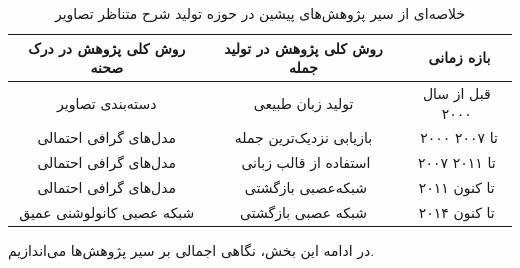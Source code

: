 \begin{table}[h]
	\centering
	\caption{خلاصه‌‌ای از سیر پژوهش‌های پیشین در حوزه تولید شرح متناظر تصاویر}
	\label{tbl:smry}
	\begin{tabular}{|c|c|c|}
		\hline
		روش کلی پژوهش در درک صحنه& روش کلی پژوهش در تولید جمله &‌ بازه زمانی
		\\
		\hline
		دسته‌بندی تصاویر & تولید زبان طبیعی & قبل از سال ۲۰۰۰
		\\
		مدل‌های گرافی احتمالی & بازیابی نزدیک‌ترین جمله &‌ ۲۰۰۰ تا ۲۰۰۷
		\\
		مدل‌های گرافی احتمالی &‌ استفاده از قالب زبانی & ۲۰۰۷ تا ۲۰۱۱
		\\
		مدل‌های گرافی احتمالی &‌ شبکه‌عصبی بازگشتی & ۲۰۱۱ تا کنون
		\\
		شبکه عصبی کانولوشنی عمیق &  شبکه عصبی بازگشتی & ۲۰۱۴ تا کنون
		\\
		\hline
	\end{tabular}
\end{table}

در ادامه این بخش، نگاهی اجمالی بر سیر پژوهش‌ها می‌اندازیم.

